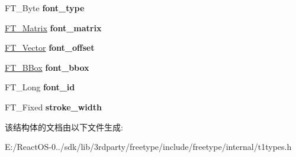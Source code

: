 \begin{DoxyCompactItemize}
$$F\+T\+\_\+\+Byte {\bfseries font\+\_\+type}
\item 
\mbox{\label{struct_t1___font_rec___a87c95f084851d2bb9e48889e9444b2a8}} 
\hyperlink{struct_f_t___matrix__}{F\+T\+\_\+\+Matrix} {\bfseries font\+\_\+matrix}
\item 
\mbox{\label{struct_t1___font_rec___ab6e773e20df1c585dc14ee3fa7ed1737}} 
\hyperlink{struct_f_t___vector__}{F\+T\+\_\+\+Vector} {\bfseries font\+\_\+offset}
\item 
\mbox{\label{struct_t1___font_rec___a86fd1af4c03e34b7d151054ccc7525a7}} 
\hyperlink{struct_f_t___b_box__}{F\+T\+\_\+\+B\+Box} {\bfseries font\+\_\+bbox}
\item 
\mbox{\label{struct_t1___font_rec___a14178cf438d1a5fcb31b7d398d06cfaf}} 
F\+T\+\_\+\+Long {\bfseries font\+\_\+id}
\item 
\mbox{\label{struct_t1___font_rec___ac71ace1872be6b2adbd3d6f5ca456d23}} 
F\+T\+\_\+\+Fixed {\bfseries stroke\+\_\+width}
\end{DoxyCompactItemize}


该结构体的文档由以下文件生成\+:\begin{DoxyCompactItemize}
\item 
E\+:/\+React\+O\+S-\/0../sdk/lib/3rdparty/freetype/include/freetype/internal/t1types.\+h\end{DoxyCompactItemize}
